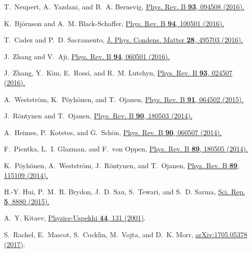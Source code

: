 \documentclass[aps,prl,reprint,nobibnotes]{revtex4-1}
\begin{document}
\begin{thebibliography}{10}
T.~Neupert, A.~Yazdani, and B.~A. Bernevig,
\newblock \href{https://doi.org/10.1103/PhysRevB.93.094508}{Phys. Rev. B {\bf 93}, 094508 (2016).}

K.~Bj\"ornson and A.~M. Black-Schaffer,
\newblock \href{https://doi.org/10.1103/PhysRevB.94.100501}{Phys. Rev. B {\bf 94}, 100501 (2016).}

T.~Cadez and P.~D. Sacramento,
\newblock \href{http://dx.doi.org/10.1088/0953-8984/28/49/495703}{J. Phys. Condens. Matter {\bf 28}, 495703 (2016).}

J.~Zhang and V.~Aji,
\newblock \href{https://doi.org/10.1103/PhysRevB.94.060501}{Phys. Rev. B {\bf 94}, 060501 (2016).}

J.~Zhang, Y.~Kim, E.~Rossi, and R.~M. Lutchyn,
\newblock \href{https://doi.org/10.1103/PhysRevB.93.024507}{Phys. Rev. B {\bf 93}, 024507 (2016).}

A.~Weststr\"om, K.~P\"oyh\"onen, and T.~Ojanen,
\newblock \href{https://doi.org/10.1103/PhysRevB.91.064502}{Phys. Rev. B {\bf 91}, 064502 (2015).}

J.~R\"ontynen and T.~Ojanen,
\newblock \href{https://doi.org/10.1103/PhysRevB.90.180503}{Phys. Rev. B {\bf 90}, 180503 (2014).}

A.~Heimes, P.~Kotetes, and G.~Sch\"on,
\newblock \href{https://doi.org/10.1103/PhysRevB.90.060507}{Phys. Rev. B {\bf 90}, 060507 (2014).}

F.~Pientka, L.~I. Glazman, and F.~von Oppen,
\newblock \href{https://doi.org/10.1103/PhysRevB.89.180505}{Phys. Rev. B {\bf 89}, 180505 (2014).}

K.~P\"oyh\"onen, A.~Weststr\"om, J.~R\"ontynen, and T.~Ojanen,
\newblock \href{https://doi.org/10.1103/PhysRevB.89.115109}{Phys. Rev. B {\bf 89}, 115109 (2014).}

H.-Y. Hui, P.~M.~R. Brydon, J.~D. Sau, S.~Tewari, and S.~D. Sarma,
\newblock \href{https://doi.org/10.1038/srep08880}{Sci. Rep. {\bf 5}, 8880 (2015).}

A.~Y. Kitaev,
\newblock \href{http://stacks.iop.org/1063-7869/44/i=10S/a=S29}{Physics-Uspekhi {\bf 44}, 131 (2001)}.

S.~{Rachel}, E.~{Mascot}, S.~{Cocklin}, M.~{Vojta}, and D.~K. {Morr},
\newblock \href{https://arxiv.org/abs/1705.05378}{arXiv:1705.05378  (2017)}.


\end{thebibliography}
\end{document}
